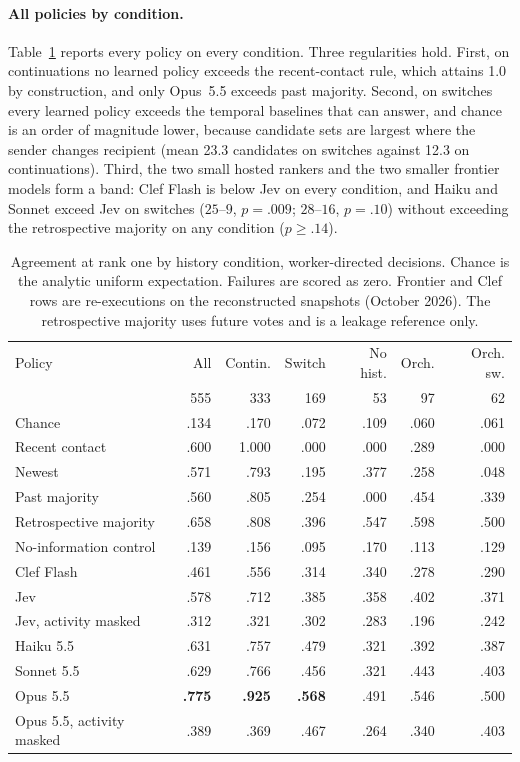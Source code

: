 \documentclass[11pt]{article}
\theoremstyle{definition}
\begin{document}
\paragraph{All policies by condition.}
Table~\ref{tab:arms} reports every policy on every condition. Three regularities hold. First, on continuations no learned policy exceeds the recent-contact rule, which attains 1.0 by construction, and only Opus~5.5 exceeds past majority. Second, on switches every learned policy exceeds the temporal baselines that can answer, and chance is an order of magnitude lower, because candidate sets are largest where the sender changes recipient (mean 23.3 candidates on switches against 12.3 on continuations). Third, the two small hosted rankers and the two smaller frontier models form a band: Clef Flash is below Jev on every condition, and Haiku and Sonnet exceed Jev on switches ($25$--$9$, $p = .009$; $28$--$16$, $p = .10$) without exceeding the retrospective majority on any condition ($p \ge .14$).

\begin{table}[t]
\centering\footnotesize
\caption{Agreement at rank one by history condition, worker-directed decisions. Chance is the analytic uniform expectation. Failures are scored as zero. Frontier and Clef rows are re-executions on the reconstructed snapshots (October 2026). The retrospective majority uses future votes and is a leakage reference only.}
\label{tab:arms}
\begin{tabular}{lrrrrrr}
\toprule
Policy & All & Contin. & Switch & No hist. & Orch. & Orch. sw. \\
 & 555 & 333 & 169 & 53 & 97 & 62 \\
\midrule
Chance & .134 & .170 & .072 & .109 & .060 & .061 \\
Recent contact & .600 & 1.000 & .000 & .000 & .289 & .000 \\
Newest & .571 & .793 & .195 & .377 & .258 & .048 \\
Past majority & .560 & .805 & .254 & .000 & .454 & .339 \\
Retrospective majority & .658 & .808 & .396 & .547 & .598 & .500 \\
\midrule
No-information control & .139 & .156 & .095 & .170 & .113 & .129 \\
Clef Flash & .461 & .556 & .314 & .340 & .278 & .290 \\
Jev & .578 & .712 & .385 & .358 & .402 & .371 \\
Jev, activity masked & .312 & .321 & .302 & .283 & .196 & .242 \\
Haiku 5.5 & .631 & .757 & .479 & .321 & .392 & .387 \\
Sonnet 5.5 & .629 & .766 & .456 & .321 & .443 & .403 \\
Opus 5.5 & \textbf{.775} & \textbf{.925} & \textbf{.568} & .491 & .546 & .500 \\
Opus 5.5, activity masked & .389 & .369 & .467 & .264 & .340 & .403 \\
\bottomrule
\end{tabular}
\end{table}
\end{document}
